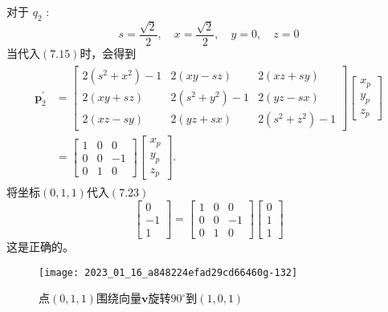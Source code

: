对于 $q_{2}$ :
$$
s=\frac{\sqrt{2}}{2}, \quad x=\frac{\sqrt{2}}{2}, \quad y=0, \quad z=0
$$
当代入$(7.15)$时，会得到
\begin{align}
\begin{aligned}
\mathbf{p}_{2}^{\prime} & =\left[\begin{array}{ccc}
2\left(s^{2}+x^{2}\right)-1 & 2(x y-s z) & 2(x z+s y) \\
2(x y+s z) & 2\left(s^{2}+y^{2}\right)-1 & 2(y z-s x) \\
2(x z-s y) & 2(y z+s x) & 2\left(s^{2}+z^{2}\right)-1
\end{array}\right]\left[\begin{array}{l}
x_{p} \\
y_{p} \\
z_{p}
\end{array}\right] \\
& =\left[\begin{array}{ccc}
1 & 0 & 0 \\
0 & 0 & -1 \\
0 & 1 & 0
\end{array}\right]\left[\begin{array}{c}
x_{p} \\
y_{p} \\
z_{p}
\end{array}\right] .
\end{aligned}
\end{align}
将坐标$(0,1,1)$代入$(7.23)$
$$
\left[\begin{array}{c}
0 \\
-1 \\
1
\end{array}\right]=\left[\begin{array}{ccc}
1 & 0 & 0 \\
0 & 0 & -1 \\
0 & 1 & 0
\end{array}\right]\left[\begin{array}{l}
0 \\
1 \\
1
\end{array}\right]
$$
这是正确的。

\begin{figure}[h!]
    \centering
    \texttt{[image: 2023\_01\_16\_a848224efad29cd66460g-132]}
    \caption[short]{点$(0,1,1)$围绕向量$\mathbf{v}$旋转$90^{\circ}$到$(1,0,1)$}
\end{figure}

